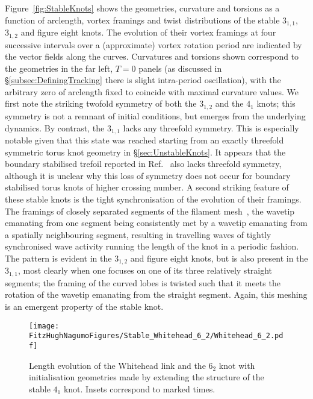 Figure~\ref{fig:StableKnots} shows the geometries, curvature and torsions as a function of arclength, vortex framings and twist distributions of the stable $3_{1,1}$, $3_{1,2}$ and figure eight knots. The evolution of their vortex framings at four successive intervals over a (approximate) vortex rotation period are indicated by the vector fields along the curves. Curvatures and torsions shown correspond to the geometries in the far left, $T=0$ panels (as discussed in \S \ref{subsec:DefiningTracking} there is slight intra-period oscillation), with the arbitrary zero of arclength fixed to coincide with maximal curvature values. We first note the striking twofold symmetry of both the $3_{1,2}$ and the $4_1$ knots; this symmetry is not a remnant of initial conditions, but emerges from the underlying dynamics. By contrast, the $3_{1,1}$ lacks any threefold symmetry. This is especially notable given that this state was reached starting from an exactly threefold symmetric torus knot geometry in \S \ref{sec:UnstableKnots}. It appears that the boundary stabilised trefoil reported in Ref.~\citep{Maucher2017} also lacks threefold symmetry, although it is unclear why this loss of symmetry does not occur for boundary stabilised torus knots of higher crossing number. A second striking feature of these stable knots is the tight synchronisation of the evolution of their framings. The framings of closely separated segments of the filament mesh~\citep{Henze1993}, the wavetip emanating from one segment being consistently met by a wavetip emanating from a spatially neighbouring segment, resulting in travelling waves of tightly synchronised wave activity running the length of the knot in a periodic fashion. The pattern is evident in the $3_{1,2}$ and figure eight knots, but is also present in the $3_{1,1}$, most clearly when one focuses on one of its three relatively straight segments; the framing of the curved lobes is twisted such that it meets the rotation of the wavetip emanating from the straight segment. Again, this meshing is an emergent property of the stable knot. 
\begin{figure}[htbp]
\centering
    \texttt{[image: \\FitzHughNagumoFigures/Stable\_Whitehead\_6\_2/Whitehead\_6\_2.pdf]}
\caption{Length evolution of the Whitehead link and the $6_2$ knot with initialisation geometries made by extending the structure of the stable $4_1$ knot. Insets correspond to marked times.}
\label{fig:Whitehead_6_2}
\end{figure}

